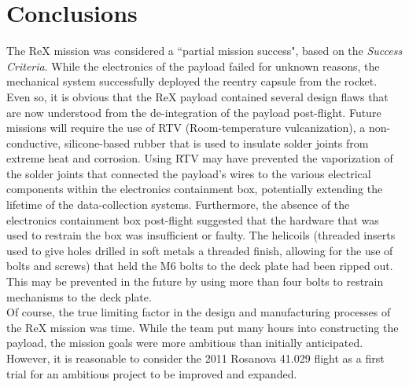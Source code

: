 \documentclass{article}
\begin{document}
\section{Conclusions}
	\begin{doublespace}
		\indent\indent The ReX mission was considered a ``partial mission success", based on the \emph{Success Criteria}. While the electronics of the payload failed for unknown reasons, the mechanical system successfully deployed the reentry capsule from the rocket. Even so, it is obvious that the ReX payload contained several design flaws that are now understood from the de-integration of the payload post-flight. Future missions will require the use of RTV (Room-temperature vulcanization), a non-conductive, silicone-based rubber that is used to insulate solder joints from extreme heat and corrosion. Using RTV may have prevented the vaporization of the solder joints that connected the payload's wires to the various electrical components within the electronics containment box, potentially extending the lifetime of the data-collection systems. Furthermore, the absence of the electronics containment box post-flight suggested that the hardware that was used to restrain the box was insufficient or faulty. The helicoils (threaded inserts used to give holes drilled in soft metals a threaded finish, allowing for the use of bolts and screws) that held the M6 bolts to the deck plate had been ripped out. This may be prevented in the future by using more than four bolts to restrain mechanisms to the deck plate.\\
		\indent Of course, the true limiting factor in the design and manufacturing processes of the ReX mission was time. While the team put many hours into constructing the payload, the mission goals were more ambitious than initially anticipated. However, it is reasonable to consider the 2011 Rosanova 41.029 flight as a first trial for an ambitious project to be improved and expanded.
	\end{doublespace}
\end{document}
